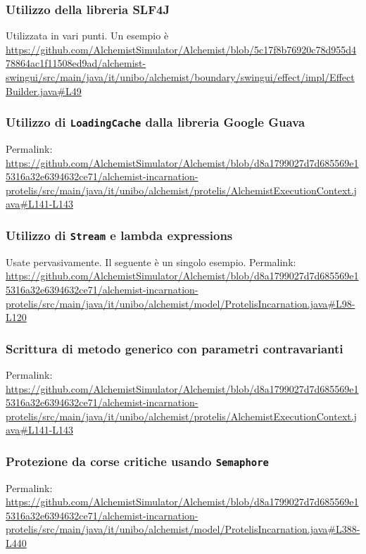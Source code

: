 \documentclass[a4paper,12pt]{report}
\begin{document}
	\subsubsection{Utilizzo della libreria SLF4J}
	
	Utilizzata in vari punti.
	Un esempio è \url{https://github.com/AlchemistSimulator/Alchemist/blob/5c17f8b76920c78d955d478864ac1f11508ed9ad/alchemist-swingui/src/main/java/it/unibo/alchemist/boundary/swingui/effect/impl/EffectBuilder.java#L49}
	
	\subsubsection{Utilizzo di \texttt{LoadingCache} dalla libreria Google Guava}
	
	Permalink: \url{https://github.com/AlchemistSimulator/Alchemist/blob/d8a1799027d7d685569e15316a32e6394632ce71/alchemist-incarnation-protelis/src/main/java/it/unibo/alchemist/protelis/AlchemistExecutionContext.java#L141-L143}
	
	\subsubsection{Utilizzo di \texttt{Stream} e lambda expressions}
	
	Usate pervasivamente. Il seguente è un singolo esempio.
	Permalink: \url{https://github.com/AlchemistSimulator/Alchemist/blob/d8a1799027d7d685569e15316a32e6394632ce71/alchemist-incarnation-protelis/src/main/java/it/unibo/alchemist/model/ProtelisIncarnation.java#L98-L120}
	
	\subsubsection{Scrittura di metodo generico con parametri contravarianti}
	
	Permalink: \url{https://github.com/AlchemistSimulator/Alchemist/blob/d8a1799027d7d685569e15316a32e6394632ce71/alchemist-incarnation-protelis/src/main/java/it/unibo/alchemist/protelis/AlchemistExecutionContext.java#L141-L143}
	
	\subsubsection{Protezione da corse critiche usando \texttt{Semaphore}}
	
	Permalink: \url{https://github.com/AlchemistSimulator/Alchemist/blob/d8a1799027d7d685569e15316a32e6394632ce71/alchemist-incarnation-protelis/src/main/java/it/unibo/alchemist/model/ProtelisIncarnation.java#L388-L440}
	
\end{document}
